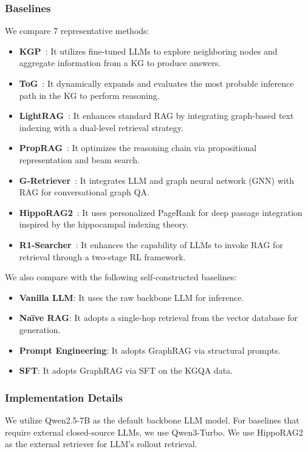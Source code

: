 \subsubsection{Baselines}
We compare 7 representative methods:
\begin{itemize}[leftmargin=0.5cm]
        \item \textbf{KGP}~\cite{wang2024kgp}: It utilizes fine-tuned LLMs to explore neighboring nodes and aggregate information from a KG to produce answers.
        \item \textbf{ToG}~\cite{tog}: It dynamically expands and evaluates the most probable inference path in the KG to perform reasoning.
        \item \textbf{LightRAG}~\cite{guo2024lightrag}: It enhances standard RAG by integrating graph-based text indexing with a dual-level retrieval strategy.
        \item \textbf{PropRAG}~\cite{wang2025proprag}: It optimizes the reasoning chain via propositional representation and beam search.
        \item \textbf{G-Retriever}~\cite{he2024grtriever}: It integrates LLM and graph neural network (GNN) with RAG for conversational graph QA.
        \item \textbf{HippoRAG2}~\cite{gutierrez2025hipporag2}: It uses personalized PageRank for deep passage integration inspired by the hippocampal indexing theory.
        \item \textbf{R1-Searcher}~\cite{song2025r1searcher}: It enhances the capability of LLMs to invoke RAG for retrieval through a two-stage RL framework.
\end{itemize}
We also compare with the following self-constructed baselines:
\begin{itemize}[leftmargin=0.5cm]
        \item \textbf{Vanilla LLM}: It uses the raw backbone LLM for inference. 
        \item \textbf{Naïve RAG}: It adopts a single-hop retrieval from the vector database for generation.
        \item \textbf{Prompt Engineering}: It adopts GraphRAG via structural prompts.
        \item \textbf{SFT}: It adopts GraphRAG via SFT on the KGQA data.
\end{itemize}



\subsubsection{Implementation Details}
We utilize Qwen2.5-7B as the default backbone LLM model. For baselines that require external closed-source LLMs, we use Qwen3-Turbo. 
We use HippoRAG2 as the external retriever for LLM's rollout retrieval.



